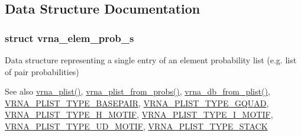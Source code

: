 \subsection{Data Structure Documentation}
\label{structvrna__elem__prob__s}
\subsubsection{struct vrna\+\_\+elem\+\_\+prob\+\_\+s}
Data structure representing a single entry of an element probability list (e.\+g. list of pair probabilities) 

\begin{DoxySeeAlso}{See also}
\hyperlink{group__struct__utils__plist_gaf002d69024d709744664a8b9ca3dd77d}{vrna\+\_\+plist()}, \hyperlink{group__part__func__global_ga94f6efc0b8d8712b023452794a0a5bd2}{vrna\+\_\+plist\+\_\+from\+\_\+probs()}, \hyperlink{group__struct__utils__dot__bracket_ga6a51a36b9245d0bac868c5cd172b9611}{vrna\+\_\+db\+\_\+from\+\_\+plist()}, \hyperlink{group__struct__utils__plist_ga7c7484a8a1e6704b1aefaf589f3b27c1}{V\+R\+N\+A\+\_\+\+P\+L\+I\+S\+T\+\_\+\+T\+Y\+P\+E\+\_\+\+B\+A\+S\+E\+P\+A\+IR}, \hyperlink{group__struct__utils__plist_gac91ab79e9feede5347103949ecf04f8a}{V\+R\+N\+A\+\_\+\+P\+L\+I\+S\+T\+\_\+\+T\+Y\+P\+E\+\_\+\+G\+Q\+U\+AD}, \hyperlink{group__struct__utils__plist_ga4d142e0187b8410b61ec2b168ed4513e}{V\+R\+N\+A\+\_\+\+P\+L\+I\+S\+T\+\_\+\+T\+Y\+P\+E\+\_\+\+H\+\_\+\+M\+O\+T\+IF}, \hyperlink{group__struct__utils__plist_gadf5905518079b5495bce3394cd7afb9a}{V\+R\+N\+A\+\_\+\+P\+L\+I\+S\+T\+\_\+\+T\+Y\+P\+E\+\_\+\+I\+\_\+\+M\+O\+T\+IF}, \hyperlink{group__struct__utils__plist_ga01d749cdb675dcdbac1dc5103378c699}{V\+R\+N\+A\+\_\+\+P\+L\+I\+S\+T\+\_\+\+T\+Y\+P\+E\+\_\+\+U\+D\+\_\+\+M\+O\+T\+IF}, \hyperlink{group__struct__utils__plist_ga36df728a95452170ca8684fc224299ea}{V\+R\+N\+A\+\_\+\+P\+L\+I\+S\+T\+\_\+\+T\+Y\+P\+E\+\_\+\+S\+T\+A\+CK} 
\end{DoxySeeAlso}
